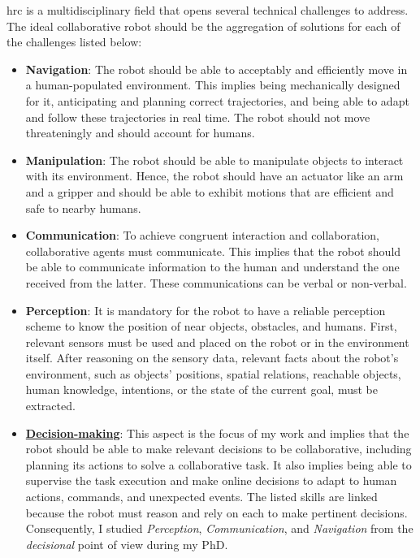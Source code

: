 \acrfull{hrc} is a multidisciplinary field that opens several technical challenges to address. The ideal collaborative robot should be the aggregation of solutions for each of the challenges listed below:

\begin{itemize}
    \item \textbf{Navigation}: The robot should be able to acceptably and efficiently move in a human-populated environment. This implies being mechanically designed for it, anticipating and planning correct trajectories, and being able to adapt and follow these trajectories in real time. The robot should not move threateningly and should account for humans.

    \item \textbf{Manipulation}: The robot should be able to manipulate objects to interact with its environment. Hence, the robot should have an actuator like an arm and a gripper and should be able to exhibit motions that are efficient and safe to nearby humans.

    \item \textbf{Communication}: To achieve congruent interaction and collaboration, collaborative agents must communicate. This implies that the robot should be able to communicate information to the human and understand the one received from the latter. These communications can be verbal or non-verbal.

    \item \textbf{Perception}: It is mandatory for the robot to have a reliable perception scheme to know the position of near objects, obstacles, and humans. First, relevant sensors must be used and placed on the robot or in the environment itself. After reasoning on the sensory data, relevant facts about the robot's environment, such as objects' positions, spatial relations, reachable objects, human knowledge, intentions, or the state of the current goal, must be extracted. 
    
    \item \uline{\textbf{Decision-making}}: This aspect is the focus of my work and implies that the robot should be able to make relevant decisions to be collaborative, including planning its actions to solve a collaborative task. It also implies being able to supervise the task execution and make online decisions to adapt to human actions, commands, and unexpected events. The listed skills are linked because the robot must reason and rely on each to make pertinent decisions. Consequently, I studied \textit{Perception}, \textit{Communication}, and \textit{Navigation} from the \textit{decisional} point of view during my PhD.

\end{itemize}
    
